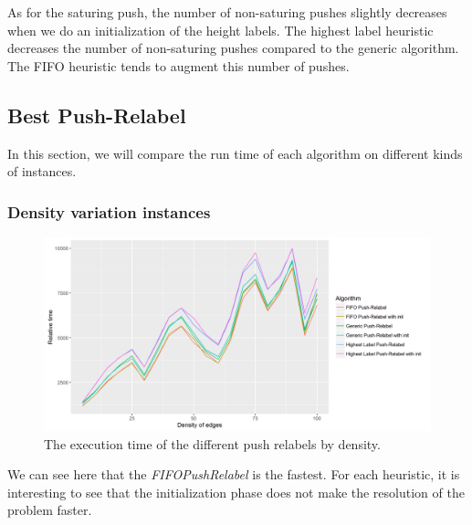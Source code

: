 As for the saturing push, the number of non-saturing pushes slightly decreases when we do an initialization of the height labels. The highest label heuristic decreases the number of non-saturing pushes compared to the generic algorithm. The FIFO heuristic tends to augment this number of pushes.



\subsection{Best Push-Relabel}

In this section, we will compare the run time of each algorithm on different kinds of instances.

\subsubsection{Density variation instances}
\begin{figure}[H]
\begin{center}
\includegraphics[scale=0.5]{images/meandensitypr.png}
\caption{The execution time of the different push relabels by density.}
\label{fig:mean_density_pr}
\end{center}
\end{figure}

We can see here that the \textit{FIFOPushRelabel} is the fastest. For each heuristic, it is interesting to see that the initialization phase does not make the resolution of the problem faster. 


